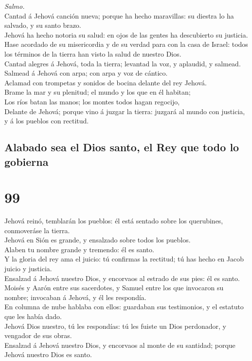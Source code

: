  \emph{Salmo.}\\
Cantad á Jehová canción nueva; porque ha hecho maravillas: su diestra lo
ha salvado, y su santo brazo.\\
 Jehová ha hecho notoria su salud: en ojos de las gentes ha
descubierto su justicia.\\
 Hase acordado de su misericordia y de su verdad para con la
casa de Israel: todos los términos de la tierra han visto la salud de
nuestro Dios.\\
 Cantad alegres á Jehová, toda la tierra; levantad la voz, y
aplaudid, y salmead.\\
 Salmead á Jehová con arpa; con arpa y voz de cántico.\\
 Aclamad con trompetas y sonidos de bocina delante del rey
Jehová.\\
 Brame la mar y su plenitud; el mundo y los que en él
habitan;\\
 Los ríos batan las manos; los montes todos hagan
regocijo,\\
 Delante de Jehová; porque vino á juzgar la tierra: juzgará
al mundo con justicia, y á los pueblos con rectitud.

\hypertarget{alabado-sea-el-dios-santo-el-rey-que-todo-lo-gobierna}{%
\subsection{Alabado sea el Dios santo, el Rey que todo lo
gobierna}\label{alabado-sea-el-dios-santo-el-rey-que-todo-lo-gobierna}}

\hypertarget{section-98}{%
\section{99}\label{section-98}}

 Jehová reinó, temblarán los pueblos: él está sentado sobre
los querubines, conmoveráse la tierra.\\
 Jehová en Sión es grande, y ensalzado sobre todos los
pueblos.\\
 Alaben tu nombre grande y tremendo: él es santo.\\
 Y la gloria del rey ama el juicio: tú confirmas la
rectitud; tú has hecho en Jacob juicio y justicia.\\
 Ensalzad á Jehová nuestro Dios, y encorvaos al estrado de
sus pies: él es santo.\\
 Moisés y Aarón entre sus sacerdotes, y Samuel entre los que
invocaron su nombre; invocaban á Jehová, y él les respondía.\\
 En columna de nube hablaba con ellos: guardaban sus
testimonios, y el estatuto que les había dado.\\
 Jehová Dios nuestro, tú les respondías: tú les fuiste un
Dios perdonador, y vengador de sus obras.\\
 Ensalzad á Jehová nuestro Dios, y encorvaos al monte de su
santidad; porque Jehová nuestro Dios es santo.

